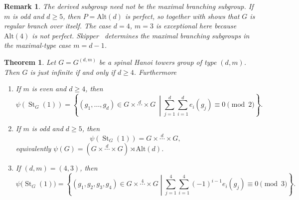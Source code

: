 \documentclass[11pt,leqno]{amsart}
\theoremstyle{plain}
\newtheorem{theorem}{Theorem}[section]
\newtheorem{remark}[remark]{Remark}
\DeclareMathOperator{\St}{St}
\newcommand{\alt}{\mathrm{Alt}}
\numberwithin{equation}{section}
\begin{document}
\begin{remark}
	The derived subgroup need not be the maximal branching subgroup. If $m$ is odd and $d\geq 5$, then $P=\alt(d)$ is perfect, so  together with  shows that $G$ is regular branch over itself. The case $d=4$, $m=3$ is exceptional here because $\alt(4)$ is not perfect. Skipper~\cite{Rachel} determines the maximal branching subgroups in the maximal-type case $m=d-1$.
\end{remark}

\begin{theorem}\label{thm:typem-just-infinite}
	Let $G=G^{(d,m)}$ be a spinal Hanoi towers group of type $(d,m)$. Then $G$ is just infinite if and only if $d\geq 4$. Furthermore
    \begin{enumerate}
    \item If $m$ is even and $d \geq 4$, then
	\[
	\psi(\St_G(1))=
	\left\{
	(g_1,\ldots,g_d)\in G\times \stackrel{d}{\cdots}\times G\ \middle|
	\sum_{j=1}^d\sum_{i=1}^d e_i(g_j)\equiv 0 \pmod 2
	\right\}.
	\]
    \item  If $m$ is odd and $d\geq 5$, then
	\[
	\psi(\St_G(1))=G\times\stackrel{d}{\cdots}\times G,
	\]
	equivalently $\psi(G)= (G\times \stackrel{d}{\cdots}\times G)\rtimes\alt(d)$.
    \item If $(d,m)=(4,3)$, then
    \[
	\psi\bigl(\St_G(1)\bigr)=
		\left\{
		(g_1,g_2,g_3,g_4)\in G\times \stackrel{4}{\cdots}\times G  \middle|
		\sum_{j=1}^{4}\sum_{i=1}^{4}(-1)^{i-1}e_i(g_j)\equiv 0 \pmod{3}
		\right\}.
    \]
    \end{enumerate}
\end{theorem}
\end{document}

